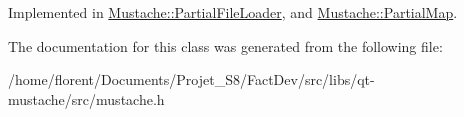 Implemented in \hyperlink{classMustache_1_1PartialFileLoader_a36ba8b817708a8755293db46bceb0dbb}{Mustache\-::\-Partial\-File\-Loader}, and \hyperlink{classMustache_1_1PartialMap_a676a6f9a77cdd53e91b18216733b2781}{Mustache\-::\-Partial\-Map}.



The documentation for this class was generated from the following file\-:\begin{DoxyCompactItemize}
\item 
/home/florent/\-Documents/\-Projet\-\_\-\-S8/\-Fact\-Dev/src/libs/qt-\/mustache/src/mustache.\-h\end{DoxyCompactItemize}
